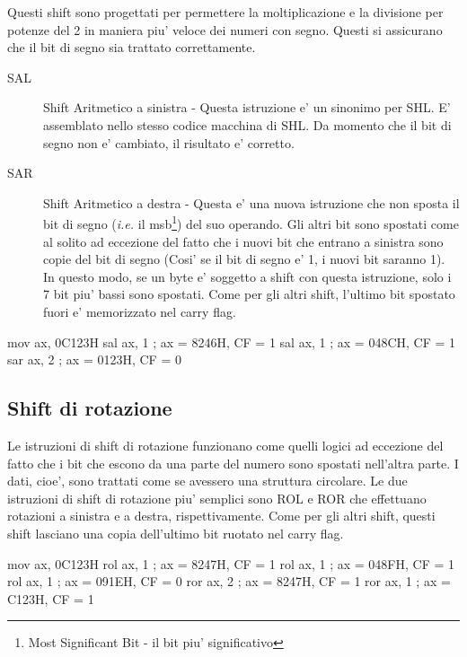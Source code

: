 Questi shift sono progettati per permettere la moltiplicazione e la 
divisione per potenze del 2 in maniera piu' veloce dei numeri con 
segno. Questi si assicurano che il bit di segno sia trattato
correttamente.
\begin{description}
\item[SAL]  Shift Aritmetico a sinistra - Questa istruzione e'
					 un sinonimo per {\code SHL}. E' assemblato nello stesso codice
					 macchina di {\code SHL}. Da momento che il bit di segno non e'
					 cambiato, il risultato e' corretto. 
\item[SAR]  Shift Aritmetico a destra - Questa e' una nuova 
					 istruzione che non sposta il bit di segno (\emph{i.e.} il msb\footnote{Most                     Significant Bit - il bit piu' significativo}) del suo operando. 
					 Gli altri bit sono spostati come al solito ad eccezione del fatto
					 che i nuovi bit che entrano a sinistra sono copie del bit di segno
					 (Cosi' se il bit di segno e' 1, i nuovi bit saranno 1). In questo
					 modo, se un byte e' soggetto a shift con questa istruzione, solo i
					 7 bit piu' bassi sono spostati. Come per gli altri shift, l'ultimo bit
					 spostato fuori e' memorizzato nel carry flag. 
\end{description}

\begin{AsmCodeListing}[frame=none]
      mov    ax, 0C123H
      sal    ax, 1           ; ax = 8246H, CF = 1
      sal    ax, 1           ; ax = 048CH, CF = 1
      sar    ax, 2           ; ax = 0123H, CF = 0
\end{AsmCodeListing}

\subsection{Shift di rotazione}

Le istruzioni di shift di rotazione funzionano come quelli logici ad eccezione
del fatto che i bit che escono da una parte del numero sono spostati
nell'altra parte. I dati, cioe', sono trattati come se avessero una
struttura circolare. Le due istruzioni di shift di rotazione piu' semplici
sono {\code ROL}  e {\code ROR}  che effettuano
rotazioni a sinistra e a destra, rispettivamente. Come per gli altri
shift, questi shift lasciano una copia dell'ultimo bit ruotato nel
carry flag.  
\begin{AsmCodeListing}[frame=none]
      mov    ax, 0C123H
      rol    ax, 1           ; ax = 8247H, CF = 1
      rol    ax, 1           ; ax = 048FH, CF = 1
      rol    ax, 1           ; ax = 091EH, CF = 0
      ror    ax, 2           ; ax = 8247H, CF = 1
      ror    ax, 1           ; ax = C123H, CF = 1
\end{AsmCodeListing}

